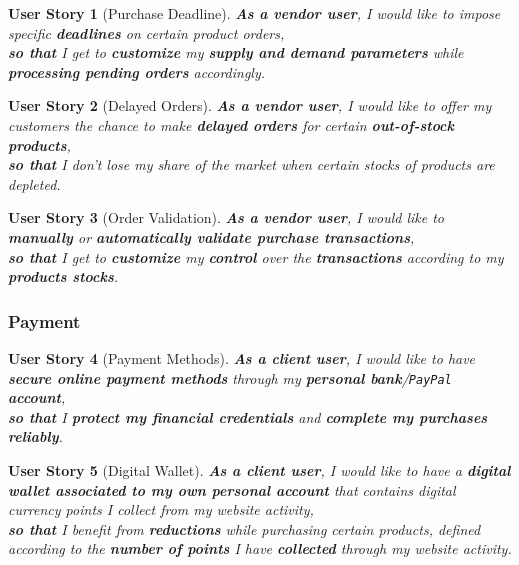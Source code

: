\documentclass[a4paper,12pt]{book}
\theoremstyle{break}
\newtheorem{userStory}{User Story}
\theoremstyle{break}
\theoremstyle{definition}
\theoremstyle{remark}
\begin{document}
\begin{userStory}[Purchase Deadline]
\textbf{As a {\color{red} vendor} user}, I would like to impose specific \textbf{deadlines} on certain product orders,\\
\indent
\textbf{so that} I get to \textbf{customize} my \textbf{supply and demand parameters} while \textbf{processing pending orders} accordingly.
\end{userStory}

\begin{userStory}[Delayed Orders]
\textbf{As a {\color{red} vendor} user}, I would like to offer my customers the chance to make \textbf{delayed orders} for certain \textbf{out-of-stock products},\\
\indent
\textbf{so that} I don't lose my share of the market when certain stocks of products are depleted.
\end{userStory}

\begin{userStory}[Order Validation]
\textbf{As a {\color{red} vendor} user}, I would like to \textbf{manually} or \textbf{automatically validate purchase transactions},\\
\indent
\textbf{so that} I get to \textbf{customize} my \textbf{control} over the \textbf{transactions} according to my \textbf{products stocks}.
\end{userStory}

\subsubsection{Payment}
\begin{userStory}[Payment Methods]
\textbf{As a {\color{green} client} user}, I would like to have \textbf{secure online payment methods} through my \textbf{personal bank}/\texttt{PayPal} \textbf{account},\\
\indent
\textbf{so that} I \textbf{protect my financial credentials} and \textbf{complete my purchases reliably}.
\end{userStory}

\begin{userStory}[Digital Wallet]
\textbf{As a {\color{green} client} user}, I would like to have a \textbf{digital wallet associated to my own personal account} that contains digital currency points I collect from my website activity,\\
\indent
\textbf{so that} I benefit from \textbf{reductions} while purchasing certain products, defined according to the \textbf{number of points} I have \textbf{collected} through my website activity.
\end{userStory}
\end{document}
